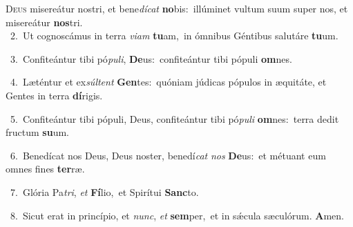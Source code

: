\lettrine{\initial\textcolor{\initialcolor}{D}}{eus} misereátur nostri, et bene\-\textit{dí}\-\textit{cat} \textbf{no}\-bis:~\star illúminet vultum suum super nos, et misereátur \textbf{nos}\-tri.\\
{\numbfont\textcolor{\numbcolor}{~2.}}~Ut cognoscámus in terra \textit{vi}\-\textit{am} \textbf{tu}\-am,~\star in ómnibus Géntibus salutáre \textbf{tu}\-um.\par
{\numbfont\textcolor{\numbcolor}{~3.}}~Confiteántur tibi pó\-\textit{pu}\-\textit{li}, \textbf{De}\-us:~\star confiteántur tibi pópuli \textbf{om}\-nes.\par
{\numbfont\textcolor{\numbcolor}{~4.}}~Læténtur et ex\-\textit{súl}\-\textit{tent} \textbf{Gen}\-tes:~\star quóniam júdicas pópulos in æquitáte, et Gentes in terra \textbf{dí}\-rigis.\par
{\numbfont\textcolor{\numbcolor}{~5.}}~Confiteántur tibi pópuli, Deus, confiteántur tibi pó\-\textit{pu}\-\textit{li} \textbf{om}\-nes:~\star terra dedit fructum \textbf{su}\-um.\par
{\numbfont\textcolor{\numbcolor}{~6.}}~Benedícat nos Deus, Deus noster, benedí\textit{cat} \textit{nos} \textbf{De}\-us:~\star et métuant eum omnes fines \textbf{ter}\-ræ.\par
{\numbfont\textcolor{\numbcolor}{~7.}}~Glória Pa\-\textit{tri}\-, \textit{et} \textbf{Fí}\-lio,~\star et Spirítui \textbf{Sanc}\-to.\par
{\numbfont\textcolor{\numbcolor}{~8.}}~Sicut erat in princípio, et \textit{nunc}\-, \textit{et} \textbf{sem}\-per,~\star et in sǽcula sæculórum. \textbf{A}\-men.\par
